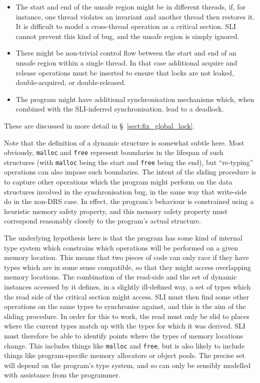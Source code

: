 \begin{itemize}
\item
  The start and end of the unsafe region might be in different threads, if, for instance, one thread violates an invariant and another thread then restores it.
  It is difficult to model a cross-thread operation as a critical section.
  SLI cannot prevent this kind of bug, and the unsafe region is simply ignored.
\item
  There might be non-trivial control flow between the start and end of an unsafe region within a single thread.
  In that case additional acquire and release operations must be inserted to ensure that locks are not leaked, double-acquired, or double-released.
\item
  The program might have additional synchronisation mechanisms which, when combined with the SLI-inferred synchronisation, lead to a deadlock.
\end{itemize}

These are discussed in more detail in \S~\ref{sect:fix_global_lock}.


Note that the definition of a dynamic structure is somewhat subtle here.
Most obviously, \verb|malloc| and \verb|free| represent boundaries in the lifespan of such structures (with \verb|malloc| being the start and \verb|free| being the end), but ``re-typing'' operations can also impose such boundaries.
The intent of the sliding procedure is to capture other operations which the program might perform on the data structures involved in the synchronisation bug, in the same way that write-side \StateMachines do in the non-DRS case.
In effect, the program's behaviour is constrained using a heuristic memory safety property, and this memory safety property must correspond reasonably closely to the program's actual structure.

The underlying hypothesis here is that the program has some kind of internal type system which constrains which operations will be performed on a given memory location.
This means that two pieces of code can only race if they have types which are in some sense compatible, so that they might access overlapping memory locations.
The combination of the read-side \StateMachine and the set of dynamic instances accessed by it defines, in a slightly ill-defined way, a set of types which the read side of the critical section might access.
SLI must then find some other operations on the same types to synchronise against, and this is the aim of the sliding procedure.
In order for this to work, the read \StateMachine must only be slid to places where the current types match up with the types for which it was derived.
SLI must therefore be able to identify points where the types of memory locations change.
This includes things like \verb|malloc| and \verb|free|, but is also likely to include things like program-specific memory allocators or object pools.
The precise set will depend on the program's type system, and so can only be sensibly modelled with assistance from the programmer.





